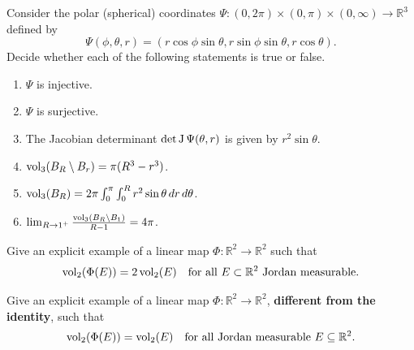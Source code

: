 \begin{exercise}
\label{ex:examHS24_TF_spherical}
Consider the polar (spherical) coordinates $\Psi \colon (0, 2\pi) \times (0, \pi) \times (0, \infty)
\to \mathbb{R}^3$ defined by
\[ \Psi(\phi, \theta, r) = (r \cos \phi \sin \theta, r \sin \phi \sin \theta, r \cos \theta). \]
Decide whether each of the following statements is true or false.
\begin{enumerate}[label=\textbf{(\alph*)}]
  \item $\Psi$ is injective.
  \item $\Psi$ is surjective.
  \item The Jacobian determinant $\det \operatorname{J}\Psi(\theta, r)$ is given by $r^2 \sin \theta$.
  \item $\operatorname{vol}_3(B_R \setminus B_r) = \pi(R^3 - r^3)$.
  \item $\operatorname{vol}_3(B_R) = 2\pi \int_0^\pi \int_0^R r^2 \sin \theta \, dr \, d\theta$.
  \item $\lim_{R \to 1^+} \frac{\operatorname{vol}_3(B_R \setminus B_1)}{R - 1} = 4\pi$.
\end{enumerate}
\end{exercise}

\begin{exercise}
\label{ex:examHS24_box_linear_vol}
Give an explicit example of a linear map $\Phi \colon \mathbb{R}^2 \to \mathbb{R}^2$ such that
\[ \operatorname{vol}_2(\Phi(E)) = 2 \operatorname{vol}_2(E) \quad \text{for all } E \subset \mathbb{R}^2 \text{ Jordan measurable.} \]
\end{exercise}

\begin{exercise}
\label{ex:box_linear_volume_preserving}
Give an explicit example of a linear map $\Phi : \mathbb{R}^2 \to \mathbb{R}^2$, \textbf{different
from the identity}, such that
\[\operatorname{vol}_2(\Phi(E)) = \operatorname{vol}_2(E) \quad \text{for all Jordan measurable } E \subseteq \mathbb{R}^2 .\]
\end{exercise}

